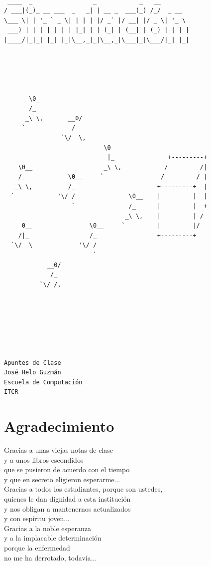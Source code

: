 \begin{verbatim}

 ____  _                 _            _   __
/ ___|(_)_ __ ___  _   _| | __ _  ___(_) /_/  _ __
\___ \| | '_ ` _ \| | | | |/ _` |/ __| |/ _ \| '_ \
 ___) | | | | | | | |_| | | (_| | (__| | (_) | | | |
|____/|_|_| |_| |_|\__,_|_|\__,_|\___|_|\___/|_| |_|





       \0_
       /_
      _\ \,       __0/
     `             /_
                `\/  \,
                            \0__
                             |_               +---------+
    \0__                    _\ \,            /         /|
    /_            \0__     `                /         / |
   _\ \,          /_                       +---------+  |
  `            '\/ /               \0__    |         |  |
                   `               /_      |         |  +
                                  _\ \,    |         | /
     0__                \0__     `         |         |/
    /|_                 /_                 +---------+
  `\/  \             '\/ /
                         `
            __0/
             /_
          `\/ /,







Apuntes de Clase
José Helo Guzmán
Escuela de Computación
ITCR

\end{verbatim}
 \newpage


\chapter*{Agradecimiento}


Gracias a unas viejas notas de clase \\
y a unos libros escondidos \\
que se pusieron de acuerdo con el tiempo\\ 
y que en secreto eligieron esperarme...\\

Gracias a todos los estudiantes, porque son ustedes,\\
quienes le dan dignidad a esta institución\\
y nos obligan a mantenernos actualizados\\
y con espíritu joven...\\

Gracias a la noble esperanza\\
y a la implacable determinación\\
porque la enfermedad\\
no me ha derrotado, todavía...\\
 

